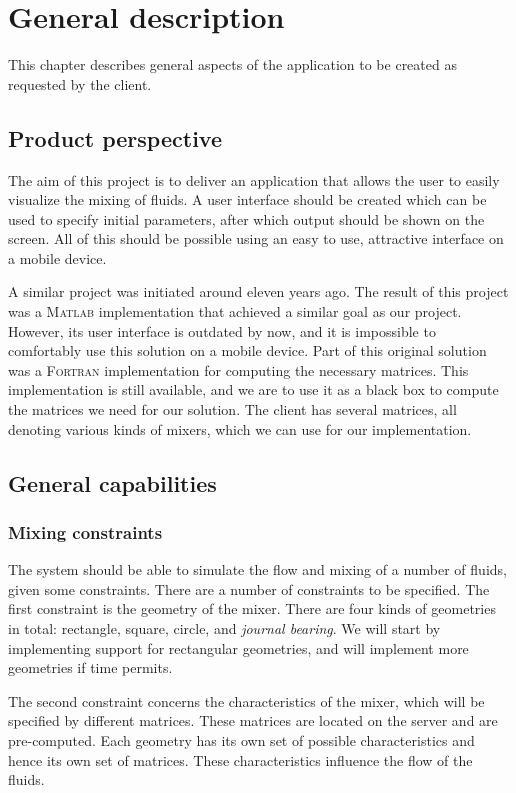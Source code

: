 \chapter{General description}
This chapter describes general aspects of the application to be created as requested by the client.

\section{Product perspective}
The aim of this project is to deliver an application that allows the user to easily visualize the mixing of fluids. A user interface should be created which can be used to specify initial parameters, after which output should be shown on the screen. All of this should be possible using an easy to use, attractive interface on a mobile device.

A similar project was initiated around eleven years ago. The result of this project was a \textsc{Matlab} implementation that achieved a similar goal as our project. However, its user interface is outdated by now, and it is impossible to comfortably use this solution on a mobile device. Part of this original solution was a \textsc{Fortran} implementation for computing the necessary matrices. This implementation is still available, and we are to use it as a black box to compute the matrices we need for our solution. The client has several matrices, all denoting various kinds of mixers, which we can use for our implementation.
\section{General capabilities}
\subsection{Mixing constraints}
The system should be able to simulate the flow and mixing of a number of fluids, given some constraints. There are a number of constraints to be specified. The first constraint is the geometry of the mixer. There are four kinds of geometries in total: rectangle, square, circle, and \emph{journal bearing}. We will start by implementing support for rectangular geometries, and will implement more geometries if time permits.
 
The second constraint concerns the characteristics of the mixer, which will be specified by different matrices. These matrices are located on the server and are pre-computed. Each geometry has its own set of possible characteristics and hence its own set of matrices. These characteristics influence the flow of the fluids.

